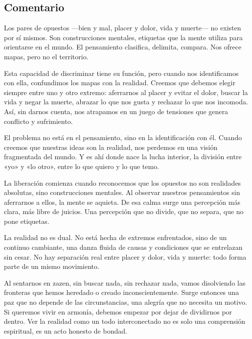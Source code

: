 \documentclass[
  a5paperpaper,
]{article}
\begin{document}
\hfill\break

\hypertarget{comentario-43}{%
\subsection{Comentario}\label{comentario-43}}

Los pares de opuestos ---bien y mal, placer y dolor, vida y muerte--- no
existen por sí mismos. Son construcciones mentales, etiquetas que la
mente utiliza para orientarse en el mundo. El pensamiento clasifica,
delimita, compara. Nos ofrece mapas, pero no el territorio.

Esta capacidad de discriminar tiene su función, pero cuando nos
identificamos con ella, confundimos los mapas con la realidad. Creemos
que debemos elegir siempre entre uno y otro extremo: aferrarnos al
placer y evitar el dolor, buscar la vida y negar la muerte, abrazar lo
que nos gusta y rechazar lo que nos incomoda. Así, sin darnos cuenta,
nos atrapamos en un juego de tensiones que genera conflicto y
sufrimiento.

El problema no está en el pensamiento, sino en la identificación con él.
Cuando creemos que nuestras ideas son la realidad, nos perdemos en una
visión fragmentada del mundo. Y es ahí donde nace la lucha interior, la
división entre «yo» y «lo otro», entre lo que quiero y lo que temo.

La liberación comienza cuando reconocemos que los opuestos no son
realidades absolutas, sino construcciones mentales. Al observar nuestros
pensamientos sin aferrarnos a ellos, la mente se aquieta. De esa calma
surge una percepción más clara, más libre de juicios. Una percepción que
no divide, que no separa, que no pone etiquetas.

La realidad no es dual. No está hecha de extremos enfrentados, sino de
un continuo cambiante, una danza fluida de causas y condiciones que se
entrelazan sin cesar. No hay separación real entre placer y dolor, vida
y muerte: todo forma parte de un mismo movimiento.

Al sentarnos en zazen, sin buscar nada, sin rechazar nada, vamos
disolviendo las fronteras que hemos heredado o creado inconscientemente.
Surge entonces una paz que no depende de las circunstancias, una alegría
que no necesita un motivo. Si queremos vivir en armonía, debemos empezar
por dejar de dividirnos por dentro. Ver la realidad como un todo
interconectado no es solo una comprensión espiritual, es un acto honesto
de bondad.

\hfill\break
\end{document}
